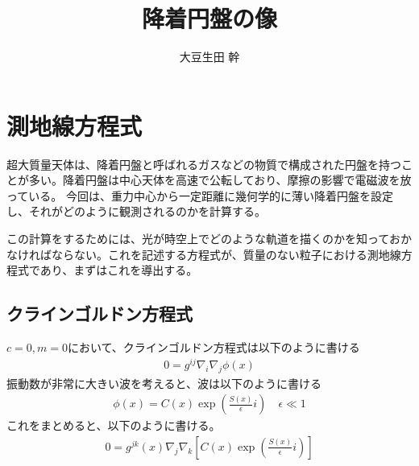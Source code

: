 \documentclass[dvipdfmx]{report} %
\title{降着円盤の像}
\author{大豆生田 幹}
\date{}
\begin{document}
\maketitle %
\tableofcontents %
\fontsize{11pt}{11pt}\selectfont %

\chapter{測地線方程式}

超大質量天体は、降着円盤と呼ばれるガスなどの物質で構成された円盤を持つことが多い。降着円盤は中心天体を高速で公転しており、摩擦の影響で電磁波を放っている。
今回は、重力中心から一定距離に幾何学的に薄い降着円盤を設定し、それがどのように観測されるのかを計算する。

この計算をするためには、光が時空上でどのような軌道を描くのかを知っておかなければならない。これを記述する方程式が、質量のない粒子における測地線方程式であり、まずはこれを導出する。
\section{クラインゴルドン方程式}
$c=0, m=0$において、クラインゴルドン方程式は以下のように書ける
\begin{equation}
\begin{split}
	0 = g^{ij}\nabla_{i}\nabla_{j}\phi(x)
\end{split}
\end{equation}
振動数が非常に大きい波を考えると、波は以下のように書ける
\begin{equation}
\begin{split}
	\phi(x) = C(x)\exp{ \left( \frac{S(x)}{\epsilon}i \right) } \quad \epsilon \ll 1
\end{split}
\end{equation}
これをまとめると、以下のように書ける。
\begin{equation*}
\begin{split}
	0 = g^{jk}(x)\nabla_{j}\nabla_{k}
		\left[ C(x)\exp{ \left( \frac{S(x)}{\epsilon}i \right) } \right]
\end{split}
\end{equation*}
\end{document}
